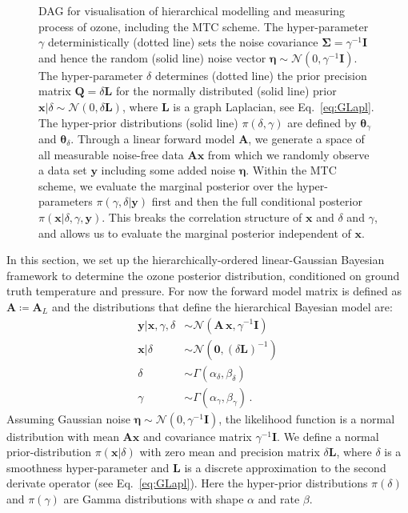\begin{figure}[htb!]
\begin{tikzpicture}
	\end{tikzpicture} 
	\caption[Directed acyclic graph for ozone retrieval and MTC scheme.]{DAG for visualisation of hierarchical modelling and measuring process of ozone, including the MTC scheme. The hyper-parameter $\gamma$ deterministically (dotted line) sets the noise covariance $\bm{\Sigma} = \gamma^{-1}\bm{I}$ and hence the random (solid line) noise vector $\bm{\eta} \sim \mathcal{N}(0, \gamma^{-1}\bm{I})$.
		The hyper-parameter $\delta$ determines (dotted line) the prior precision matrix $\bm{Q} = \delta \bm{L}$ for the normally distributed (solid line) prior $\bm{x}| \delta \sim \mathcal{N}(0, \delta \bm{L})$, where $\bm{L}$ is a graph Laplacian, see Eq.~\ref{eq:GLapl}.
		The hyper-prior distributions (solid line) $\pi(\delta, \gamma)$ are defined by $\bm{\theta}_{\gamma}$ and $\bm{\theta}_{\delta}$.
		Through a linear forward model $\bm{A}$, we generate a space of all measurable noise-free data $\bm{A}\bm{x}$ from which we randomly observe a data set $\bm{y}$ including some added noise $\bm{\eta}$.
		Within the MTC scheme, we evaluate the marginal posterior over the hyper-parameters $\pi(\gamma, \delta | \bm{y})$ first and then the full conditional posterior $\pi(\bm{x}|\delta,\gamma,\bm{y})$. This breaks the correlation structure of $\bm{x}$ and $\delta$ and $\gamma$, and allows us to evaluate the marginal posterior independent of $\bm{x}$.}
	\label{fig:DAGO3}
\end{figure}
In this section, we set up the hierarchically-ordered linear-Gaussian Bayesian framework to determine the ozone posterior distribution, conditioned on ground truth temperature and pressure.
For now the forward model matrix is defined as $\bm{A} \coloneqq \bm{A}_L$ and the distributions that define the hierarchical Bayesian model are:
\begin{subequations}
		\label{eq:O3BayMode}
	\begin{align}
		\bm{y} |  \bm{x},\gamma,\delta  &\sim \mathcal{N}(\bm{A} \, \bm{x}, \gamma^{-1} \bm{I}) \label{eq:likelihoodAppl} \\
		\bm{x}| \delta  &\sim \mathcal{N}(\bm{0}, (\delta \bm{L})^{-1} ) \label{eq:priorXAppl} \\
		\delta  &\sim \Gamma(\alpha_{\delta}, \beta_{\delta})\label{eq:priorDelAppl} \\
		\gamma  &\sim \Gamma(\alpha_{\gamma}, \beta_{\gamma})\label{eq:priorGamAppl} \, .
	\end{align} 
\end{subequations}
Assuming Gaussian noise $\bm{\eta} \sim \mathcal{N}(0, \gamma^{-1} \bm{I})$, the likelihood function is a normal distribution with mean $\bm{A} \bm{x}$ and covariance matrix $\gamma^{-1} \bm{I}$.
We define a normal prior-distribution $\pi(\bm{x}|\delta)$ with zero mean and precision matrix $\delta \bm{L}$, where $\delta$ is a smoothness hyper-parameter and $\bm{L}$ is a discrete approximation to the second derivate operator (see Eq.~\ref{eq:GLapl}).
Here the hyper-prior distributions $\pi(\delta)$ and $\pi(\gamma)$ are Gamma distributions with shape $\alpha$ and rate $\beta$.

